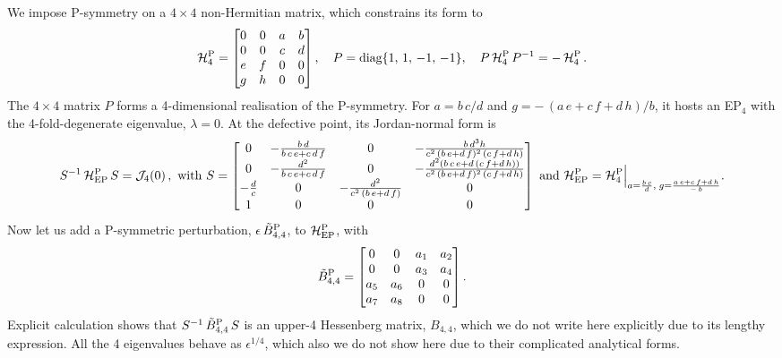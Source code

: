 \documentclass[aps, prl, onecolumn, nofootinbib, citeautoscript, nolongbibliography]{revtex4-2}
\begin{document}
We impose P-symmetry on a $4\times 4$ non-Hermitian matrix, which constrains its form to \cite{ips-emil}
\begin{align}
\mathcal H^{\rm P}_4 = \begin{bmatrix}
 0 & 0 & a & b \\
 0 & 0 & c & d \\
 e & f & 0 & 0 \\
 g & h & 0 & 0 \\
\end{bmatrix}, \quad
P = \text{diag}\lbrace 1,\,1,\,-1,\,-1 \rbrace ,\quad
P\,\mathcal H^{\rm P}_4\, P^{-1} = - \, \mathcal H^{\rm P}_4 \,.
\end{align}
The $4 \times 4 $ matrix $P$ forms a 4-dimensional realisation of the P-symmetry. 
For $ a = b\, c/d $ and $ g= -\, (a \,e+c\, f+d\, h)/b $, it hosts an EP$_4$ with the 4-fold-degenerate eigenvalue, $\lambda = 0$. At the defective point, its Jordan-normal form is
\begin{align}
S^{-1} \, {\mathcal H^{\rm P}_{\rm EP}} \, S = \mathcal J_4(0)\,, \text{ with }
S = \begin{bmatrix}
0 & -\frac{ b\, d}{b \,c\, e+c\, d\, f} & 0 & -\frac{ b\, d^3 h}{c^2 \, (b \,e+d\, f)^2 \, (c\, f+d \,h)} \\
 0 & -\frac{d^2}{b \,c\, e+c\, d\, f} & 0 & -\frac{d^2 (b \,c\, e +d \, (c\, f+d \,h))}{c^2 \, (b \,e+d\, f)^2 \, (c\, f+d \,h)} \\
 -\frac{d}{c} & 0 & -\frac{d^2}{c^2 \, (b \,e+d\, f)} & 0 \\
 1 & 0 & 0 & 0
\end{bmatrix} 
\text{ and }
{\mathcal H^{\rm P}_{\rm EP}}  = {\mathcal H^{\rm P}_4} \Big \vert_{a = \frac{b\, c} {d},\; g= \frac{a \,e+c\, f+d\, h}{ -\,b}}.
\end{align}
Now let us add a P-symmetric perturbation, $\epsilon\, \tilde B^{\rm P}_{4,4}$, to ${\mathcal H^{\rm P}_{\rm EP}}$, with
\begin{align}
\tilde B^{\rm P}_{4,4} = \begin{bmatrix}
0 & 0 & a_1 & a_2 \\
 0 & 0 & a_3 & a_4 \\
 a_5 & a_6 & 0 & 0 \\
 a_7 & a_8 & 0 & 0 \\
\end{bmatrix}.
\end{align}
Explicit calculation shows that $S^{-1}\, \tilde B^{\rm P}_{4,4}\, S $ is an upper-4 Hessenberg matrix, $ B_{4,4}$, which we do not write here explicitly due to its lengthy expression. All the 4 eigenvalues behave as $ \epsilon^{1/4} $, which also we do not show here due to their complicated analytical forms.
\end{document}
